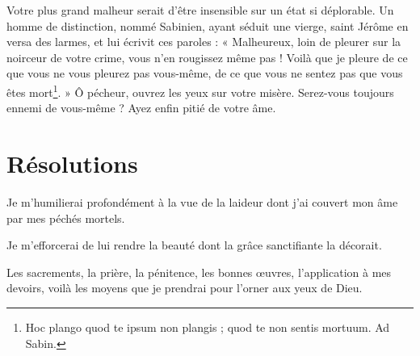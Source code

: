 \documentclass[instructions.tex]{subfiles}
\begin{document}
Votre plus grand malheur serait d’être insensible sur un état si déplorable. Un homme de distinction, nommé Sabinien, ayant séduit une vierge, saint Jérôme en versa des larmes, et lui écrivit ces paroles : « Malheureux, loin de pleurer sur la noirceur de votre crime, vous n’en rougissez même pas ! Voilà que je pleure de ce que vous ne vous pleurez pas vous-même, de ce que vous ne sentez pas que vous êtes mort\footnote{Hoc plango quod te ipsum non plangis ; quod te non sentis mortuum. Ad Sabin.}. » Ô pécheur, ouvrez les yeux sur votre misère. Serez-vous toujours ennemi de vous-même ? Ayez enfin pitié de votre âme.


\section{Résolutions}

\primo Je m’humilierai profondément à la vue de la laideur dont j’ai couvert mon âme par mes péchés mortels.

\secundo Je m’efforcerai de lui rendre la beauté dont la grâce sanctifiante la décorait.

\tertio Les sacrements, la prière, la pénitence, les bonnes œuvres, l’application à mes devoirs, voilà les moyens que je prendrai pour l’orner aux yeux de Dieu.

\end{document}
